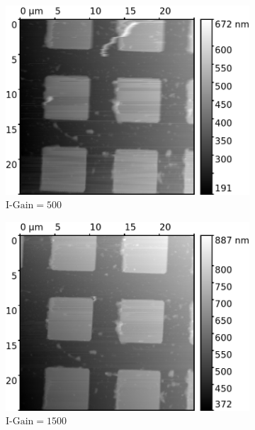 \documentclass[11pt,a4paper]{article}
\begin{document}
\begin{appendices}
\begin{figure}[H]
\centering
\begin{subfigure}[b]{0.48\textwidth}
\includegraphics[width=\textwidth]{tapping_mode_Igain_500}
\caption{$\text{I-Gain}=500$}
\end{subfigure}
\begin{subfigure}[b]{0.48\textwidth}
\includegraphics[width=\textwidth]{tapping_mode_Igain_1500}
\caption{$\text{I-Gain}=1500$}
\end{subfigure}\\\vspace{.2cm}
\begin{subfigure}[b]{0.48\textwidth}

\end{subfigure}
\end{figure}
\end{appendices}
\end{document}
